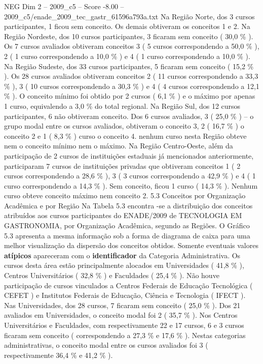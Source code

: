 \begin{textsample}{NEG Dim 2 – 2009\_c5 – Score -8.00 – 2009\_c5/enade\_2009\_tec\_gastr\_61596a793a.txt}
Na Região Norte, dos 3 cursos participantes, 1 ficou sem conceito.
Os demais obtiveram os conceitos 1 e 2.
Na Região Nordeste, dos 10 cursos participantes, 3 ficaram sem conceito ( 30,0 \% ).
Os 7 cursos avaliados obtiveram conceitos 3 ( 5 cursos correspondendo a 50,0 \% ), 2 ( 1 curso correspondendo a 10,0 \% ) e 4 ( 1 curso correspondendo a 10,0 \% ).
Na Região Sudeste, dos 33 cursos participantes, 5 ficaram sem conceito ( 15,2 \% ).
Os 28 cursos avaliados obtiveram conceitos 2 ( 11 cursos correspondendo a 33,3 \% ), 3 ( 10 cursos correspondendo a 30,3 \% ) e 4 ( 4 cursos correspondendo a 12,1 \% ).
O conceito mínimo foi obtido por 2 cursos ( 6,1 \% ) e o máximo por apenas 1 curso, equivalendo a 3,0 \% do total regional.
Na Região Sul, dos 12 cursos participantes, 6 não obtiveram conceito.
Dos 6 cursos avaliados, 3 ( 25,0 \% ) – o grupo modal entre os cursos avaliados, obtiveram o conceito 3, 2 ( 16,7 \% ) o conceito 2 e 1 ( 8,3 \% ) curso o conceito 4. nenhum curso nesta Região obteve nem o conceito mínimo nem o máximo.
Na Região Centro-Oeste, além da participação de 2 cursos de instituições estaduais já mencionados anteriormente, participaram 7 cursos de instituições privadas que obtiveram conceitos 1 ( 2 cursos correspondendo a 28,6 \% ), 3 ( 3 cursos correspondendo a 42,9 \% ) e 4 ( 1 curso correspondendo a 14,3 \% ).
Sem conceito, ficou 1 curso ( 14,3 \% ).
Nenhum curso obteve conceito máximo nem conceito 2. 5.3 Conceitos por Organização Acadêmica e por Região Na Tabela 5.3 encontra -se a distribuição dos conceitos atribuídos aos cursos participantes do ENADE/2009 de TECNOLOGIA EM GASTRONOMIA, por Organização Acadêmica, segundo as Regiões.
O Gráfico 5.3 apresenta a mesma informação sob a forma de diagrama de caixa para uma melhor visualização da dispersão dos conceitos obtidos.
Somente eventuais valores \textbf{atípicos} apareceram com o \textbf{identificador} da Categoria Administrativa.
Os cursos desta área estão principalmente alocados em Universidades ( 41,8 \% ), Centros Universitários ( 32,8 \% ) e Faculdades ( 25,4 \% ).
Não houve participação de cursos vinculados a Centros Federais de Educação Tecnológica ( CEFET ) e Institutos Federais de Educação, Ciência e Tecnologia ( IFECT ).
Nas Universidades, dos 28 cursos, 7 ficaram sem conceito ( 25,0 \% ).
Dos 21 avaliados em Universidades, o conceito modal foi 2 ( 35,7 \% ).
Nos Centros Universitários e Faculdades, com respectivamente 22 e 17 cursos, 6 e 3 cursos ficaram sem conceito ( correspondendo a 27,3 \% e 17,6 \% ).
Nestas categorias administrativas, o conceito modal entre os cursos avaliados foi 3 ( respectivamente 36,4 \% e 41,2 \% ).

\end{textsample}
